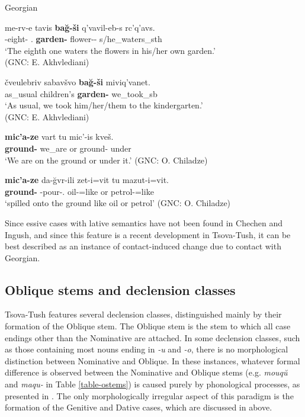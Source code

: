 \begin{exe}
	\ex\label{simplenp-ex42}
	Georgian
	\begin{xlist}
		
		
		\ex\label{simplenp-ex42a}
		\gll me-rv-e tavis \textbf{ba\u{g}-ši} q'vavil-eb-s rc'q'avs. \\
		{\Ord}-eight-{\Ord} {\Refl}.{\Poss} \textbf{garden-{\In}} flower-{\Pl}-{\Dat} s/he\_waters\_sth \\
		\trans `The eighth one waters the flowers in his/her own garden.' \\
		\hfill (GNC: E. Akhvlediani)
		
		\ex\label{simplenp-ex42b}
		\gll čveulebriv sabavšvo \textbf{ba\u{g}-ši} miviq'vanet. \\
		as\_usual children's \textbf{garden-{\In}} we\_took\_sb \\
		\trans `As usual, we took him/her/them to the kindergarten.' \\
		\hfill (GNC: E. Akhvlediani)
		
		\ex\label{simplenp-ex42c}
		\gll \textbf{mic'a-ze} vart tu mic'-is kveš. \\
		\textbf{ground-{\Super}} we\_are or ground-{\Gen} under \\
		\trans `We are on the ground or under it.'
		\hfill (GNC: O. Chiladze)
		
		\ex\label{simplenp-ex42d}
		\gll \textbf{mic'a-ze} da-\u{g}vr-ili zet-i=vit tu mazut-i=vit. \\
		\textbf{ground-{\Super}} {\Pv}-pour-{\Ptcp}.{\Aor} oil-{\Nom}=like or petrol-{\Nom}=like \\
		\trans `spilled onto the ground like oil or petrol'
		\hfill (GNC: O. Chiladze)
		
	\end{xlist}
\end{exe}

Since essive cases with lative semantics have not been found in Chechen and Ingush, and since this feature is a recent development in Tsova-Tush, it can be best described as an instance of contact-induced change due to contact with Georgian.



\subsection{Oblique stems and declension classes} \label{Oblique}

Tsova-Tush features several declension classes, distinguished mainly by their formation of the Oblique stem. The Oblique stem is the stem to which all case endings other than the Nominative are attached. In some declension classes, such as those containing most nouns ending in \textit{-u} and \textit{-o}, there is no morphological distinction between Nominative and Oblique. In these instances, whatever formal difference is observed between the Nominative and Oblique stems (e.g. \textit{mouq\u{u}} and \textit{maqu-} in Table \ref{table-ostems}) is  caused purely by phonological processes, as presented in . The only morphologically irregular aspect of this paradigm is the formation of the Genitive and Dative cases, which are discussed in  above.


